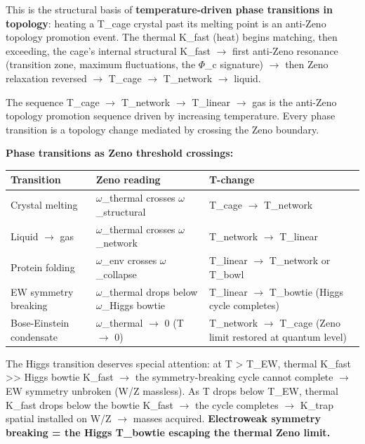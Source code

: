 \documentclass[12pt,a4paper]{article}
\begin{document}
This is the structural basis of \textbf{temperature-driven phase transitions in topology}: heating a T\_cage crystal past its melting point is an anti-Zeno topology promotion event. The thermal K\_fast (heat) begins matching, then exceeding, the cage's internal structural K\_fast $\rightarrow$ first anti-Zeno resonance (transition zone, maximum fluctuations, the $\Phi$\_c signature) $\rightarrow$ then Zeno relaxation reversed $\rightarrow$ T\_cage $\rightarrow$ T\_network $\rightarrow$ liquid.

The sequence T\_cage $\rightarrow$ T\_network $\rightarrow$ T\_linear $\rightarrow$ gas is the anti-Zeno topology promotion sequence driven by increasing temperature. Every phase transition is a topology change mediated by crossing the Zeno boundary.

\textbf{Phase transitions as Zeno threshold crossings:}

\begin{table}[htbp]
\centering
\small
{}
\begin{tabularx}{\textwidth}{>{\centering\arraybackslash}X >{\centering\arraybackslash}X >{\centering\arraybackslash}X}
\toprule
\rowcolor{gray!25}\textbf{Transition} & \textbf{Zeno reading} & \textbf{T-change} \\
\midrule
\rowcolors{1}{white}{gray!10}
Crystal melting & $\omega$\_thermal crosses $\omega$\_structural & T\_cage $\rightarrow$ T\_network \\
Liquid $\rightarrow$ gas & $\omega$\_thermal crosses $\omega$\_network & T\_network $\rightarrow$ T\_linear \\
Protein folding & $\omega$\_env crosses $\omega$\_collapse & T\_linear $\rightarrow$ T\_network or T\_bowl \\
EW symmetry breaking & $\omega$\_thermal drops below $\omega$\_Higgs bowtie & T\_linear $\rightarrow$ T\_bowtie (Higgs cycle completes) \\
Bose-Einstein condensate & $\omega$\_thermal $\rightarrow$ 0 (T $\rightarrow$ 0) & T\_network $\rightarrow$ T\_cage (Zeno limit restored at quantum level) \\
\bottomrule
\end{tabularx}
\end{table}

The Higgs transition deserves special attention: at T \textgreater{} T\_EW, thermal K\_fast \textgreater{}\textgreater{} Higgs bowtie K\_fast $\rightarrow$ the symmetry-breaking cycle cannot complete $\rightarrow$ EW symmetry unbroken (W/Z massless). As T drops below T\_EW, thermal K\_fast drops below the bowtie K\_fast $\rightarrow$ the cycle completes $\rightarrow$ K\_trap spatial installed on W/Z $\rightarrow$ masses acquired. \textbf{Electroweak symmetry breaking = the Higgs T\_bowtie escaping the thermal Zeno limit.}
\end{document}
